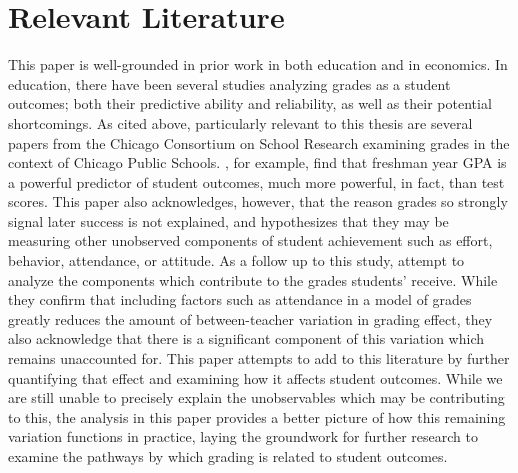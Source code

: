 \documentclass[../thesis_main.tex]{subfiles}
\begin{document}
\doublespacing
\section{Relevant Literature}
\label{section:lit}

This paper is well-grounded in prior work in both education and in economics. In education, there have been several studies analyzing grades as a student outcomes; both their predictive ability and reliability, as well as their potential shortcomings. As cited above, particularly relevant to this thesis are several papers from the Chicago Consortium on School Research examining grades in the context of Chicago Public Schools. \cite{eastonPredictivePowerNinthGrade2017}, for example, find that freshman year GPA is a powerful predictor of student outcomes, much more powerful, in fact, than test scores. This paper also acknowledges, however, that the reason grades so strongly signal later success is not explained, and hypothesizes that they may be measuring other unobserved components of student achievement such as effort, behavior, attendance, or attitude. As a follow up to this study, \cite{allensworthWhyStudentsGet2018} attempt to analyze the components which contribute to the grades students' receive. While they confirm that including factors such as attendance in a model of grades greatly reduces the amount of between-teacher variation in grading effect, they also acknowledge that there is a significant component of this variation which remains unaccounted for. This paper attempts to add to this literature by further quantifying that effect and examining how it affects student outcomes. While we are still unable to precisely explain the unobservables which may be contributing to this, the analysis in this paper provides a better picture of how this remaining variation functions in practice, laying the groundwork for further research to examine the pathways by which grading is related to student outcomes. 
\end{document}
